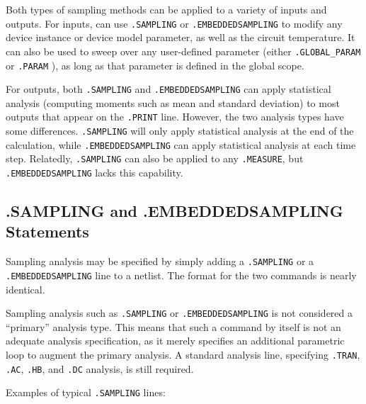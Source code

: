 Both types of sampling methods can be applied to a variety of inputs and outputs.
For inputs,
\Xyce{}  can use \verb|.SAMPLING| or \verb|.EMBEDDEDSAMPLING| to modify 
any device instance or device
model parameter, as well as the circuit temperature.  It can also be used 
to sweep over any user-defined parameter (either \texttt{.GLOBAL\_PARAM} 
or \texttt{.PARAM} ), as long as that parameter is  defined in the 
global scope.

For outputs, both \verb|.SAMPLING| and \verb|.EMBEDDEDSAMPLING| 
can apply statistical analysis (computing moments such as mean and standard deviation) 
to most outputs that appear on the \verb|.PRINT| line.
However, the two analysis types have some differences.    \verb|.SAMPLING| will only 
apply statistical analysis at the end of the calculation, while \verb|.EMBEDDEDSAMPLING| 
can apply statistical analysis at each time step.  Relatedly, 
\verb|.SAMPLING| can also be applied to any \verb|.MEASURE|, but 
\verb|.EMBEDDEDSAMPLING| lacks this capability. 

\subsection{.SAMPLING and .EMBEDDEDSAMPLING Statements}
\label{sampling_statement}
Sampling analysis may be specified by simply adding a \verb|.SAMPLING| 
or a \verb|.EMBEDDEDSAMPLING| line to a netlist.    The format for the two commands is nearly 
identical.

Sampling analysis such as \verb|.SAMPLING| or \verb|.EMBEDDEDSAMPLING| is not considered a ``primary'' analysis type.
This means that such a command by itself is not an 
adequate analysis specification, as it merely specifies an additional parametric loop to augment the
primary analysis.  A standard analysis line, specifying \verb|.TRAN|, \verb|.AC|, \verb|.HB|, 
and \verb|.DC| analysis, is still required.

Examples of typical \verb|.SAMPLING| lines:


